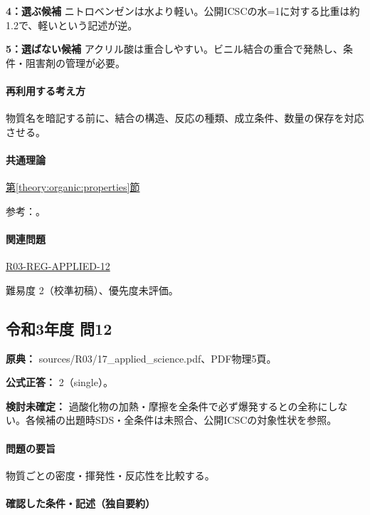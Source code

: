 \noindent\textbf{4：選ぶ候補} ニトロベンゼンは水より軽い。公開ICSCの水=1に対する比重は約1.2で、軽いという記述が逆。\par

\noindent\textbf{5：選ばない候補} アクリル酸は重合しやすい。ビニル結合の重合で発熱し、条件・阻害剤の管理が必要。\par

\paragraph{再利用する考え方} 物質名を暗記する前に、結合の構造、反応の種類、成立条件、数量の保存を対応させる。

\paragraph{共通理論} \hyperref[theory:organic:properties]{第\ref*{theory:organic:properties}節}

\par 参考：\cite{organic_nitro,organic_peroxide}。

\paragraph{関連問題} \hyperref[q:r03-reg-applied-12]{R03-REG-APPLIED-12}

\par 難易度 2（校準初稿）、優先度未評価。

\subsection{令和3年度 問12}
\label{q:r03-reg-applied-12}

\noindent\textbf{原典：} sources/R03/17\_applied\_science.pdf、PDF物理5頁。

\textbf{公式正答：} 2（single）。

\par\textbf{検討未確定：} 過酸化物の加熱・摩擦を全条件で必ず爆発するとの全称にしない。各候補の出題時SDS・全条件は未照合、公開ICSCの対象性状を参照。

\paragraph{問題の要旨} 物質ごとの密度・揮発性・反応性を比較する。

\paragraph{確認した条件・記述（独自要約）}\mbox{}\par

